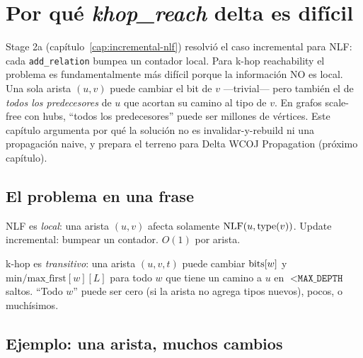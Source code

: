 \chapter{Por qué \emph{khop\_reach} delta es difícil}
\label{cap:khop-delta-hard}

\begin{intuicion}
Stage 2a (capítulo~\ref{cap:incremental-nlf}) resolvió el caso
incremental para NLF: cada \texttt{add\_relation} bumpea un
contador local. Para k-hop reachability el problema es
fundamentalmente más difícil porque la información NO es local. Una
sola arista \((u, v)\) puede cambiar el bit de \(v\) ---trivial---
pero también el de \emph{todos los predecesores} de \(u\) que
acortan su camino al tipo de \(v\). En grafos scale-free con hubs,
``todos los predecesores'' puede ser millones de vértices. Este
capítulo argumenta por qué la solución no es invalidar-y-rebuild
ni una propagación naive, y prepara el terreno para Delta WCOJ
Propagation (próximo capítulo).
\end{intuicion}

\section{El problema en una frase}

NLF es \emph{local}: una arista \((u, v)\) afecta solamente
\(\mathrm{NLF}(u, \mathrm{type}(v))\). Update incremental: bumpear un
contador. \(O(1)\) por arista.

k-hop es \emph{transitivo}: una arista \((u, v, t)\) puede cambiar
\(\mathrm{bits}[w]\) y \(\mathrm{min/max\_first}[w][L]\) para todo \(w\)
que tiene un camino a \(u\) en \(< \texttt{MAX\_DEPTH}\) saltos.
``Todo \(w\)'' puede ser cero (si la arista no agrega tipos
nuevos), pocos, o muchísimos.

\section{Ejemplo: una arista, muchos cambios}

